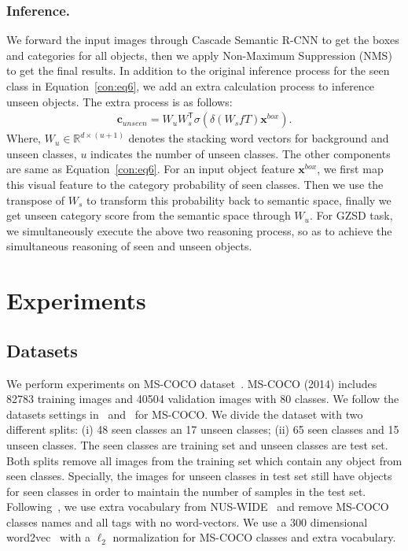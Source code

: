 \documentclass[runningheads]{llncs}
\begin{document}
\subsubsection{Inference.}
We forward the input images through Cascade Semantic R-CNN to get the boxes and categories for all objects, then we apply Non-Maximum Suppression (NMS) to get the final results. In addition to the original inference process for the seen class in Equation~\ref{con:eq6}, we add an extra calculation process to inference unseen objects. The extra process is as follows:
\begin{align}
\mathbf{c}_{unseen} = 
    W_{u}W_{s}^\mathsf{T}\sigma(\delta(W_{s}fT)\mathbf{x}^{box}).
\end{align}
Where, $W_{u} \in \mathbb{R}^{d \times (u+1)}$ denotes the stacking word vectors for background and unseen classes, $u$ indicates the number of unseen classes. The other components are same as Equation~\ref{con:eq6}. For an input object feature $\mathbf{x}^{box}$, we first map this visual feature to the category probability of seen classes. Then we use the transpose of $W_{s}$ to transform this probability back to semantic space, finally we get unseen category score from the semantic space through $W_{u}$. For GZSD task, we simultaneously execute the above two reasoning process, so as to achieve the simultaneous reasoning of seen and unseen objects.
\section{Experiments}
\subsection{Datasets}
We perform experiments on MS-COCO dataset~\cite{lin2014microsoft}. MS-COCO (2014) includes 82783 training images and 40504 validation images with 80 classes. We follow the datasets settings in~\cite{bansal2018zero} and~\cite{rahman2020improved} for MS-COCO. We divide the dataset with two different splits: (i) 48 seen classes an 17 unseen classes; (ii) 65 seen classes and 15 unseen classes. The seen classes are training set and unseen classes are test set. Both splits remove all images from the training set which contain any object from seen classes. Specially, the images for unseen classes in test set still have objects for seen classes in order to maintain the number of samples in the test set. Following~\cite{rahman2020improved}, we use extra vocabulary from NUS-WIDE~\cite{chua2009nus} and remove MS-COCO classes names and all tags with no word-vectors. We use a 300 dimensional word2vec~\cite{mikolov2013distributed} with a $\ell_{2}$ normalization for MS-COCO classes and extra vocabulary. 
\end{document}

